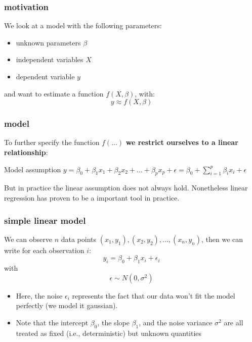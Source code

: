 \documentclass{beamer}
\begin{document}
\begin{frame}
\frametitle{motivation}
We look at a model with the following parameters:
\begin{itemize}
\item unknown parameters $\beta$
\item independent variables $X$
\item dependent variable $y$
\end{itemize}
and want to estimate a function $f(X,\beta)$, with:
\begin{equation}
y \approx f(X,\beta)
\end{equation}



\end{frame}

\begin{frame}
\frametitle{model}
To further specify the function $f(...)$  \textbf{ we restrict ourselves to a linear relationship}:
\begin{block}{Model assumption}
$y = \beta_0 + \beta_1 x_1 + \beta_2 x_2 + ... + \beta_p  x_p  + \epsilon= \beta_0 + \sum_{i = 1}^p \beta_i x_i + \epsilon$
\end{block}

But in practice the linear assumption does not always hold.
\newline
Nonetheless linear regression has proven to be a important tool in practice.
\end{frame}

\begin{frame}
\frametitle{simple linear model}
We can observe $n$ data points $(x_1,y_1),(x_2, y_2), ..., (x_n, y_n)$, then we can write for each observation $i$: 
\begin{equation*}
y_i = \beta_0 + \beta_1 x_i + \epsilon_i
\end{equation*}
with 
\begin{equation*}
\epsilon \sim N(0,\sigma^2)
\end{equation*}
\begin{itemize}
\item Here, the noise $\epsilon_i$ represents the fact that our data won’t fit the model perfectly (we model it gaussian).
\item Note that the intercept $\beta_0$, the slope $\beta_1$, and the noise
variance $\sigma^2$
are all treated as fixed (i.e., deterministic) but unknown quantities
\end{itemize}
\end{frame}
\end{document}
